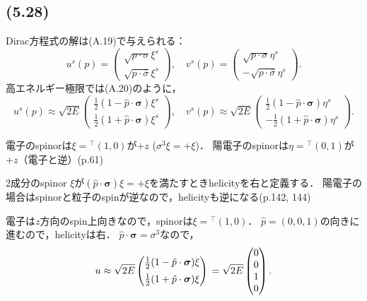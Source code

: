 \subsection{(5.28)}
Dirac方程式の解は(A.19)で与えられる：
\[
u^s(p) =
\begin{pmatrix}
  \sqrt{p \cdot \sigma} \xi^s \\[5pt]
  \sqrt{p \cdot \overline\sigma} \xi^s
\end{pmatrix}
, \quad
v^s(p) =
\begin{pmatrix}
  \sqrt{p \cdot \sigma} \eta^s \\[5pt]
  - \sqrt{p \cdot \overline\sigma} \eta^s
\end{pmatrix}
.
\]
高エネルギー極限では(A.20)のように，
\[
u^s(p) \approx \sqrt{2E}
\begin{pmatrix}
  \frac{1}{2} (1 - \hat{p} \cdot \boldsymbol\sigma) \xi^s \\[5pt]
  \frac{1}{2} (1 + \hat{p} \cdot \boldsymbol\sigma) \xi^s
\end{pmatrix}
, \quad
v^s(p) \approx \sqrt{2E}
\begin{pmatrix}
  \frac{1}{2} (1 - \hat{p} \cdot \boldsymbol\sigma) \eta^s \\[5pt]
  - \frac{1}{2} (1 + \hat{p} \cdot \boldsymbol\sigma) \eta^s
\end{pmatrix}
.
\]

\begin{screen}
  電子のspinorは\(\xi={}^\top(1, 0)\)が\(+z\) (\(\sigma^3\xi=+\xi\))．
  陽電子のspinorは\(\eta={}^\top(0, 1)\)が\(+z\)（電子と逆）(p.\@ 61)
\end{screen}
\begin{screen}
  2成分のspinor $\xi$が$(\hat{p} \cdot \boldsymbol\sigma) \xi = + \xi$を満たすときhelicityを右と定義する．
  陽電子の場合はspinorと粒子のspinが逆なので，helicityも逆になる(p.\@ 142, 144)
\end{screen}

電子は$z$方向のspin上向きなので，spinorは$\xi = {}^\top(1, 0)$．
$\hat{p} = (0, 0, 1)$の向きに進むので，helicityは右．
$\hat{p}\cdot\boldsymbol\sigma = \sigma^3$なので，
\[
u \approx \sqrt{2E}
\begin{pmatrix}
  \frac{1}{2} (1 - \hat{p} \cdot \boldsymbol\sigma) \xi \\[5pt]
  \frac{1}{2} (1 + \hat{p} \cdot \boldsymbol\sigma) \xi
\end{pmatrix}
\\
= \sqrt{2E}
\begin{pmatrix}
  0 \\
  0 \\
  1 \\
  0
\end{pmatrix}
.
\]

